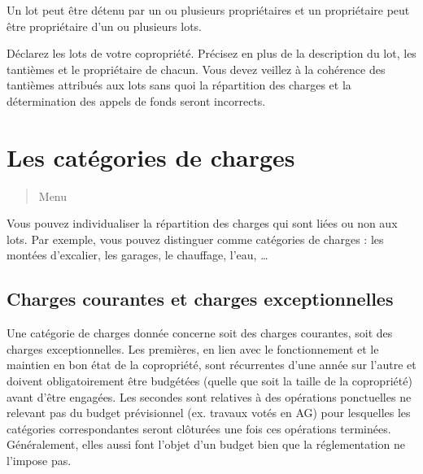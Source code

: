 \documentclass[a4paper,10pt,oneside,french]{sphinxmanual}
\begin{document}
\sphinxAtStartPar
Un lot peut être détenu par un ou plusieurs propriétaires et un propriétaire peut être propriétaire d’un ou plusieurs lots.

\sphinxAtStartPar
Déclarez les lots de votre copropriété.
Précisez en plus de la description du lot, les tantièmes et le propriétaire de chacun.
Vous devez veillez à la cohérence des tantièmes attribués aux lots sans quoi la répartition des charges et la détermination des appels de fonds seront incorrects.
\begin{quote}

\noindent{}
\end{quote}


\section{Les catégories de charges}
\label{\detokenize{condominium/classloads:les-categories-de-charges}}\label{\detokenize{condominium/classloads::doc}}\begin{quote}

\sphinxAtStartPar
Menu 
\end{quote}

\sphinxAtStartPar
Vous pouvez individualiser la répartition des charges qui sont liées ou non aux lots.
Par exemple, vous pouvez distinguer comme catégories de charges : les montées d’excalier, les garages, le chauffage, l’eau, …


\subsection{Charges courantes et charges exceptionnelles}
\label{\detokenize{condominium/classloads:charges-courantes-et-charges-exceptionnelles}}
\sphinxAtStartPar
Une catégorie de charges donnée concerne soit des charges courantes, soit des charges exceptionnelles.
Les premières, en lien avec le fonctionnement et le maintien en bon état de la copropriété, sont récurrentes d’une année sur l’autre et doivent obligatoirement être budgétées (quelle que soit la taille de la copropriété) avant d’être engagées. Les secondes sont relatives à des opérations ponctuelles ne relevant pas du budget prévisionnel (ex. travaux votés en AG) pour lesquelles les catégories correspondantes seront clôturées une fois ces opérations terminées. Généralement, elles aussi font l’objet d’un budget bien que la réglementation ne l’impose pas.
\end{document}
